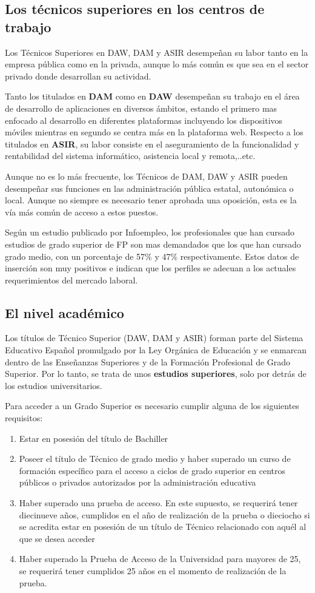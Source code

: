\subsection{Los técnicos superiores en los centros de trabajo}
Los Técnicos Superiores en DAW, DAM y ASIR desempeñan su labor tanto en la empresa pública como en la privada, aunque lo más común es que sea en el sector privado donde desarrollan su actividad.

Tanto los titulados en \textbf{DAM} como en \textbf{DAW} desempeñan su trabajo en el área de desarrollo de aplicaciones en diversos ámbitos, estando el primero mas enfocado al desarrollo en diferentes plataformas incluyendo los dispositivos móviles mientras en segundo se centra más en la plataforma web. Respecto a los titulados en \textbf{ASIR}, su labor consiste en el aseguramiento de la funcionalidad y rentabilidad del sistema informático, asistencia local y remota,..etc.

Aunque no es lo más frecuente, los Técnicos de DAM, DAW y ASIR pueden desempeñar sus funciones en las administración pública estatal, autonómica o local. Aunque no siempre es necesario tener aprobada una oposición, esta es la vía más común de acceso a estos puestos.

Según un estudio publicado por Infoempleo, los profesionales que han cursado estudios de grado superior de FP son mas demandados que los que han cursado grado medio, con un porcentaje de 57\% y 47\% respectivamente. Estos datos de inserción son muy positivos e indican que los perfiles se adecuan a los actuales requerimientos del mercado laboral.\cite{educaweb}

\subsection{El nivel académico}
Los títulos de Técnico Superior (DAW, DAM y ASIR) forman parte del Sistema Educativo Español promulgado por la Ley Orgánica de Educación y se enmarcan dentro de las Enseñanzas Superiores y de la Formación Profesional de Grado Superior. Por lo tanto, se trata de unos \textbf{estudios superiores}, solo por detrás de los estudios universitarios.

Para acceder a un Grado Superior es necesario cumplir alguna de los siguientes requisitos:
\begin{enumerate}[label={\alph*.}]
    \item Estar en posesión del título de Bachiller
    \item Poseer el título de Técnico de grado medio y haber superado un curso de formación específico para el acceso a ciclos de grado superior en centros públicos o privados autorizados por la administración educativa
    \item Haber superado una prueba de acceso. En este supuesto, se requerirá tener diecinueve años, cumplidos en el año de realización de la prueba o dieciocho si se acredita estar en posesión de un título de Técnico relacionado con aquél al que se desea acceder
    \item Haber superado la Prueba de Acceso de la Universidad para mayores de 25, se requerirá tener cumplidos 25 años en el momento de realización de la prueba.
\end{enumerate}

